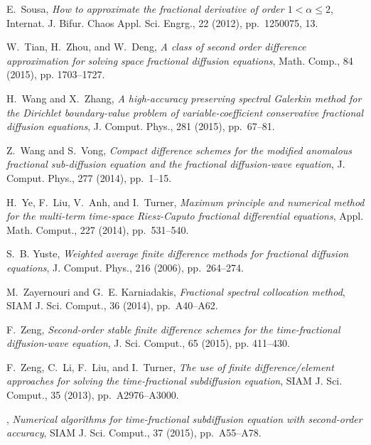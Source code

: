 \documentclass[10pt]{siamltex}
\begin{document}
\begin{thebibliography}{10}
{\sc E.~Sousa}, {\em How to approximate the fractional derivative of order
  {$1<\alpha\leq2$}}, Internat. J. Bifur. Chaos Appl. Sci. Engrg., 22 (2012),
  pp.~1250075, 13.

{\sc W.~Tian, H.~Zhou, and W.~Deng}, {\em A class of second order difference
  approximation for solving space fractional diffusion equations}, Math. Comp.,
  84 (2015), pp. 1703--1727.

{\sc H.~Wang and X.~Zhang}, {\em A high-accuracy preserving spectral {G}alerkin
  method for the {D}irichlet boundary-value problem of variable-coefficient
  conservative fractional diffusion equations}, J. Comput. Phys., 281 (2015),
  pp.~67--81.

{\sc Z.~Wang and S.~Vong}, {\em Compact difference schemes for the modified
  anomalous fractional sub-diffusion equation and the fractional diffusion-wave
  equation}, J. Comput. Phys., 277 (2014), pp.~1--15.

{\sc H.~Ye, F.~Liu, V.~Anh, and I.~Turner}, {\em Maximum principle and
  numerical method for the multi-term time-space {R}iesz-{C}aputo fractional
  differential equations}, Appl. Math. Comput., 227 (2014), pp.~531--540.




{\sc S.~B. Yuste}, {\em Weighted average finite difference methods for
  fractional diffusion equations}, J. Comput. Phys., 216 (2006), pp.~264--274.

{\sc M.~Zayernouri and G.~E. Karniadakis}, {\em Fractional spectral collocation
  method}, SIAM J. Sci. Comput., 36 (2014), pp.~A40--A62.

{\sc F.~Zeng}, {\em Second-order stable finite difference schemes for the
  time-fractional diffusion-wave equation}, J. Sci. Comput.,  65 (2015), pp. 411--430.

{\sc F.~Zeng, C.~Li, F.~Liu, and I.~Turner}, {\em The use of finite
  difference/element approaches for solving the time-fractional subdiffusion
  equation}, SIAM J. Sci. Comput., 35 (2013), pp.~A2976--A3000.

\leavevmode\vrule height 2pt depth -1.6pt width 23pt, {\em Numerical algorithms
  for time-fractional subdiffusion equation with second-order accuracy}, SIAM
  J. Sci. Comput., 37 (2015), pp.~A55--A78.


\end{thebibliography}
\end{document}
